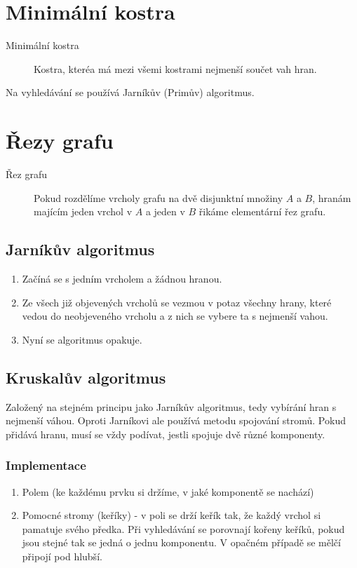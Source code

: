 \section{Minimální kostra}
  \begin{description}
    \item[Minimální kostra] Kostra, kteréa má mezi všemi kostrami nejmenší součet vah hran.
  \end{description}

  Na vyhledávání se používá Jarníkův (Primův) algoritmus.

  \section{Řezy grafu}
    \begin{description}
      \item[Řez grafu] Pokud rozdělíme vrcholy grafu na dvě disjunktní množiny $A$ a $B$, hranám majícím jeden vrchol v $A$ a jeden v $B$ řikáme elementární řez grafu.
    \end{description}

  \subsection{Jarníkův algoritmus}
    \begin{enumerate}
      \item Začíná se s jedním vrcholem a žádnou hranou.
      \item Ze všech již objevených vrcholů se vezmou v potaz všechny hrany, které vedou do neobjeveného vrcholu a z nich se vybere ta s nejmenší vahou.
      \item Nyní se algoritmus opakuje.
    \end{enumerate}

  \subsection{Kruskalův algoritmus}
    Založený na stejném principu jako Jarníkův algoritmus, tedy vybírání hran s nejmenší váhou.
    Oproti Jarníkovi ale používá metodu spojování stromů.
    Pokud přidává hranu, musí se vždy podívat, jestli spojuje dvě různé komponenty.

    \subsubsection{Implementace}
    \begin{enumerate}
      \item Polem (ke každému prvku si držíme, v jaké komponentě se nachází)
      \item Pomocné stromy (keříky) - v poli se drží keřík tak, že každý vrchol si pamatuje svého předka. Při vyhledávání se porovnají kořeny keříků, pokud jsou stejné tak se jedná o jednu komponentu. V opačném případě se mělčí připojí pod hlubší.
    \end{enumerate}
